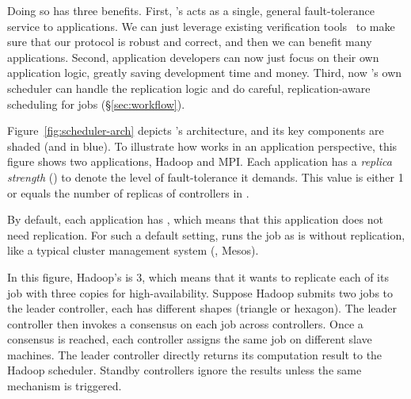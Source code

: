 Doing so has three benefits. First, \tripod's \paxos acts as a single, general 
fault-tolerance service to applications. We can just leverage existing 
verification tools~\cite{modist:nsdi09,demeter:sosp11} to make sure that our 
\falcon protocol is robust and correct, and then we can benefit many 
applications. Second, application developers can now just focus on their own 
application logic, greatly saving development time and money. Third, now 
\tripod's own scheduler can handle the replication logic and do careful, 
replication-aware scheduling for jobs  (\S\ref{sec:workflow}). 






Figure~\ref{fig:scheduler-arch} depicts \tripod's architecture, and its key 
components are shaded (and in blue). To illustrate how \tripod works in an 
application perspective, this figure shows two applications, Hadoop and MPI. 
Each application has a \emph{replica strength} () to denote the level of 
fault-tolerance it demands. This value is either 1 or equals the number of 
replicas of controllers in \tripod.

By default, each application has , which means that this application 
does not need replication. For such a default setting, \tripod runs the job as 
is without replication, like a typical cluster management system (\eg, Mesos).

In this figure, Hadoop's  is 3, which means that it wants to replicate 
each of its job with three copies for high-availability. Suppose Hadoop 
submits two jobs to the leader controller, each has different shapes (triangle 
or hexagon). The leader controller then invokes a consensus on each job across 
controllers. Once a consensus is reached, each controller assigns the same job 
on different slave machines. The leader controller directly returns its 
computation result to the Hadoop scheduler. Standby controllers ignore the 
results unless the same mechanism is triggered.

